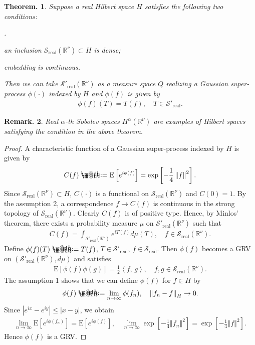\documentclass[openany, a4paper, oneside]{jsbook}
\makeatletter
\newcounter{enum2}
\renewenvironment{enumerate}{%
\begin{list}%
{%
\arabic{enum2}.\ \,%
}%
{%
\usecounter{enum2}
\setlength{\itemindent}{0pt}%
\setlength{\leftmargin}{15pt}%
\setlength{\rightmargin}{0pt}%
\setlength{\labelsep}{0pt}%
\setlength{\labelwidth}{6pt}%
\setlength{\itemsep}{0pt}%
\setlength{\parsep}{0pt}%
\setlength{\listparindent}{0pt}%
}
}{%
\end{list}%
}
\newcommand*{\defeq}{\mathrel{\rlap{%
\raisebox{0.3ex}{$\m@th\cdot$}}%
\raisebox{-0.3ex}{$\m@th\cdot$}}%
=}
\theoremstyle{break}
\newtheorem{thm}{Theorem.}[section]
\theoremstyle{breakdefn}
\newtheorem{rem}[thm]{Remark.}
\newcommand{\abs}[1]{\left|#1\right|}
\newcommand{\norm}[1]{\left\Vert#1\right\Vert}
\newcommand{\sqbk}[1]{\left[#1\right]}
\newcommand{\bkt}[2]{\left\langle#1,\,#2\right\rangle}
\newcommand{\bbRnu}{\mathbb{R}^{\nu}}
\newcommand{\E}[1]{\rmE\sqbk{#1}}
\newcommand{\realtempereddist}{\mathcal{S}'_{\mathrm{real}}}
\newcommand{\realrapiddecrease}{\mathcal{S}_{\mathrm{real}}}
\newcommand{\rmE}{\mathrm{E}}
\makeatother
\begin{document}
\begin{thm}
 Suppose a real Hilbert space $H$ satisfies the following two conditions:
\begin{enumerate}
\item an inclusion $\realrapiddecrease (\bbRnu) \subset H$ is dense;
\item embedding is continuous.
\end{enumerate}
 Then we can take $\realtempereddist (\bbRnu)$ as a measure space $Q$ realizing a Gaussian super-process $\phi (\cdot)$ indexed by $H$
 and $\phi (f)$ is given by
 \begin{align}
  \phi (f) (T) = T (f), \quad T \in \realtempereddist.
 \end{align}
\end{thm}
\begin{rem}
 Real $\alpha$-th Sobolev spaces $H^{\alpha}(\bbRnu)$ are examples of Hilbert spaces satisfying the condition in the above theorem.
\end{rem}
\begin{proof}
 A characteristic function of a Gaussian super-process indexed by $H$ is given by
 \begin{align}
  C (f) \defeq \E{e^{i \phi (f)}} = \exp \sqbk{- \frac{1}{4} \norm{f}^2}.
 \end{align}
 Since $\realrapiddecrease (\bbRnu) \subset H$, $C (\cdot)$ is a functional on $\realrapiddecrease (\bbRnu)$ and $C (0)=1$.
 By the assumption 2, a correspondence $f \to C (f)$ is continuous in the strong topology of $\realrapiddecrease (\bbRnu)$.
 Clearly $C (f)$ is of positive type.
 Hence, by Minlos' theorem, there exists a probability measure $\mu$ on $\realtempereddist (\bbRnu)$ such that
 \begin{align}
  C (f) = \int_{\realtempereddist (\bbRnu)} e^{i T (f)} d \mu (T), \quad f \in \realrapiddecrease (\bbRnu).
 \end{align}
 Define $\phi (f) (T) \defeq T (f)$, $T \in \realtempereddist$, $f \in \realrapiddecrease$.
 Then $\phi (f)$ becomes a GRV on $(\realtempereddist (\bbRnu), d \mu)$ and satisfies
 \begin{align}
  \E{\phi (f) \phi (g)} = \frac{1}{2} \bkt{f}{g}, \quad f, g \in \realrapiddecrease (\bbRnu).
 \end{align}
 The assumption 1 shows that we can define $\phi (f)$ for $f \in H$ by
 \begin{align}
  \phi (f) \defeq \lim_{n \to \infty} \phi (f_n), \quad \norm{f_n - f}_{H} \to 0.
 \end{align}
 Since $\abs{e^{ix} - e^{iy}} \leq \abs{x - y}$, we obtain
 \begin{align}
  \lim_{n \to \infty} \E{e^{i \phi (f_n)}}
  =
  \E{e^{i \phi (f)}}, \quad
  \lim_{n \to \infty} \exp \sqbk{- \frac{1}{4} \norm{f_n}^2}
  =
  \exp \sqbk{- \frac{1}{4} \norm{f}^2}.
 \end{align}
 Hence $\phi (f)$ is a GRV.
\end{proof}
\end{document}
